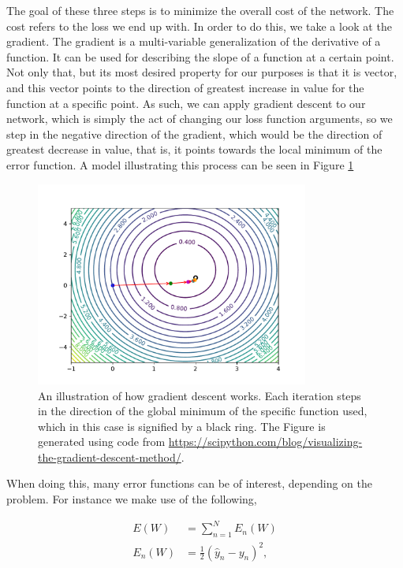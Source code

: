 The goal of these three steps is to minimize the overall cost of the network.
The cost refers to the loss we end up with. In order to do this, we take a
look at the gradient. The gradient is a multi-variable generalization of
the derivative of a function. It can be used for describing the slope of a
function at a certain point. Not only that, but its most desired property for
our purposes is that it is vector, and this vector points to the direction of
greatest increase in value for the function at a specific point. As such, we can
apply gradient descent to our network, which is simply the act of changing our
loss function arguments, so we step in the negative direction of the gradient,
which would be the direction of greatest decrease in value, that is, it points
towards the local minimum of the error function. A model illustrating this
process can be seen in Figure \ref{fig:grad}

\begin{figure}
    \centering
    \includegraphics[width=0.8\textwidth]{./pictures/method/gradient_descend}
    \caption{An illustration of how gradient descent works. Each iteration steps
        in the direction of the global minimum of the specific function used,
        which in this case is signified by a black ring. The Figure is generated
        using code from
        \url{https://scipython.com/blog/visualizing-the-gradient-descent-method/}.}
    \label{fig:grad}
\end{figure}

When doing this, many error functions can be of interest, depending on the
problem. For instance we make use of the following,

\begin{align}
    E(W)   &= \sum_{n=1}^N E_n(W) \\
    E_n(W) &= \frac{1}{2}(\hat{y}_n - y_n)^2,
\end{align}

